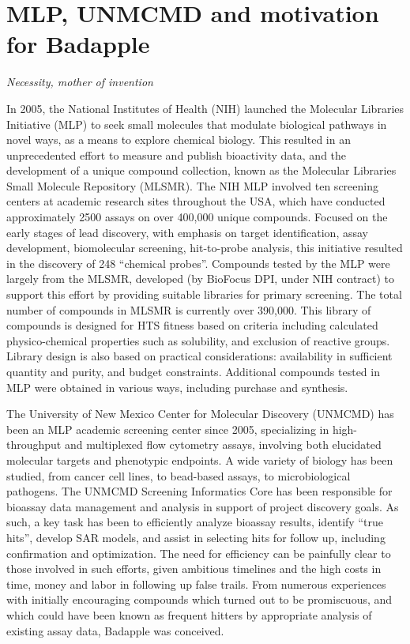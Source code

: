 \section{MLP, UNMCMD and motivation for Badapple}

\emph{Necessity, mother of invention}

In 2005, the National Institutes of Health (NIH) launched the Molecular Libraries Initiative (MLP)\cite{Austin2004-qc} to seek small molecules that modulate biological pathways in novel ways, as a means to explore chemical biology. This resulted in an unprecedented effort to measure and publish bioactivity data, and the development of a unique compound collection, known as the Molecular Libraries Small Molecule Repository (MLSMR). The NIH MLP involved ten screening centers at academic research sites throughout the USA, which have conducted approximately 2500 assays on over 400,000 unique compounds\cite{Kaiser2008-cx}. Focused on the early stages of lead discovery, with emphasis on target identification, assay development, biomolecular screening, hit-to-probe analysis, this initiative resulted in the discovery of 248 “chemical probes”\cite{Oprea2009-cp,Arrowsmith2015-mw}. Compounds tested by the MLP were largely from the MLSMR, developed (by BioFocus DPI, under NIH contract) to support this effort by providing suitable libraries for primary screening. The total number of compounds in MLSMR is currently over 390,000. This library of compounds is designed for HTS fitness based on criteria including calculated physico-chemical properties such as solubility, and exclusion of reactive groups. Library design is also based on practical considerations: availability in sufficient quantity and purity, and budget constraints. Additional compounds tested in MLP were obtained in various ways, including purchase and synthesis.

The University of New Mexico Center for Molecular Discovery (UNMCMD) has been an MLP academic screening center since 2005\cite{Edwards2014-ik}, specializing in high-throughput and multiplexed flow cytometry assays, involving both elucidated molecular targets and phenotypic endpoints. A wide variety of biology has been studied, from cancer cell lines, to bead-based assays, to microbiological pathogens. The UNMCMD Screening Informatics Core has been responsible for bioassay data management and analysis in support of project discovery goals. As such, a key task has been to efficiently analyze bioassay results, identify “true hits”, develop SAR models, and assist in selecting hits for follow up, including confirmation and optimization. The need for efficiency can be painfully clear to those involved in such efforts, given ambitious timelines and the high costs in time, money and labor in following up false trails. From numerous experiences with initially encouraging compounds which turned out to be promiscuous, and which could have been known as frequent hitters by appropriate analysis of existing assay data, Badapple was conceived\cite{Tseng2013-bm}.

